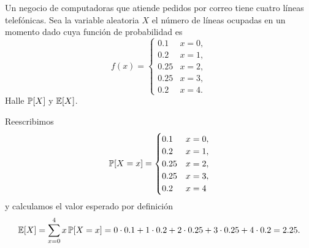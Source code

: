 \begin{statement}{1}
  Un negocio de computadoras que atiende pedidos por correo
  tiene cuatro l\'ineas telef\'onicas.
  Sea la variable aleatoria $X$ el n\'umero de l\'ineas ocupadas
  en un momento dado cuya funci\'on de probabilidad es
  \[
    f(x) = \begin{cases}
      0.1 & x = 0, \\
      0.2 & x = 1, \\
      0.25 & x = 2, \\
      0.25 & x = 3, \\
      0.2 & x = 4.
    \end{cases}  
  \]
  Halle $\mathbb{P}[X]$ y $\mathbb{E}[X]$.
\end{statement}

\begin{solution}
  Reescribimos
  \[
    \mathbb{P}[X = x] = \begin{cases}
      0.1 & x = 0, \\
      0.2 & x = 1, \\
      0.25 & x = 2, \\
      0.25 & x = 3, \\
      0.2 & x = 4
    \end{cases}
  \]
  y calculamos el valor esperado por definici\'on
  \[
    \mathbb{E}[X] = \sum_{x = 0}^4 x \, \mathbb{P}[X = x] =
    0 \cdot 0.1 +
    1 \cdot 0.2 +
    2 \cdot 0.25 +
    3 \cdot 0.25 +
    4 \cdot 0.2
    = 2.25.
  \]
\end{solution}